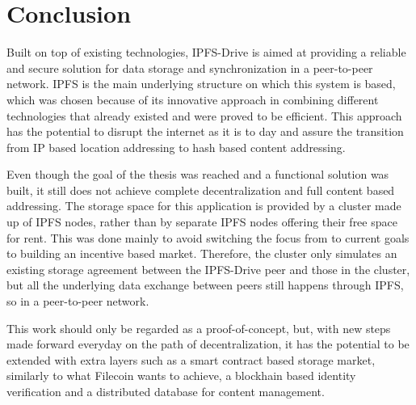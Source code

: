\documentclass[12pt]{report}
\begin{document}
\chapter{Conclusion}

Built on top of existing technologies, IPFS-Drive is aimed at providing a reliable and secure solution for data storage and synchronization in a peer-to-peer network. IPFS is the main underlying structure on which this system is based, which was chosen because of its innovative approach in combining different technologies that already existed and were proved to be efficient. This approach has the potential to disrupt the internet as it is to day and assure the transition from IP based location addressing to hash based content addressing.

Even though the goal of the thesis was reached and a functional solution was built, it still does not achieve complete decentralization and full content based addressing. The storage space for this application is provided by a cluster made up of IPFS nodes, rather than by separate IPFS nodes offering their free space for rent. This was done mainly to avoid switching the focus from to current goals to building an incentive based market. Therefore, the cluster only simulates an existing storage agreement between the IPFS-Drive peer and those in the cluster, but all the underlying data exchange between peers still happens through IPFS, so in a peer-to-peer network.

This work should only be regarded as a proof-of-concept, but, with new steps made forward everyday on the path of decentralization, it has the potential to be extended with extra layers such as a smart contract based storage market, similarly to what Filecoin \cite{filecoin} wants to achieve, a blockhain based identity verification \cite{id} and a distributed database \cite{db} for content management.
\end{document}
